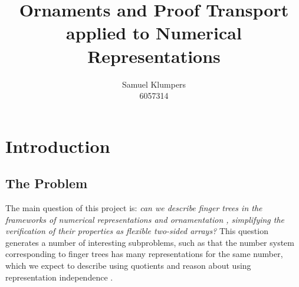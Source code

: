 \documentclass{article}
\title{Ornaments and Proof Transport applied to Numerical Representations}
\author{Samuel Klumpers\\6057314}
\theoremstyle{plain}%
\theoremstyle{definition}
\begin{document}
\maketitle

\begin{abstract}
\listoftodos
\end{abstract}

\tableofcontents


\section{Introduction}\label{sec:intro}


\subsection{The Problem}
The main question of this project is: \textit{can we describe finger trees \cite{fingertrees} in the frameworks of numerical representations and ornamentation \cite{progorn}, simplifying the verification of their properties as flexible two-sided arrays?} This question generates a number of interesting subproblems, such as that the number system corresponding to finger trees has many representations for the same number, which we expect to describe using quotients \cite{cuagda} and reason about using representation independence \cite{iri}. %
\end{document}
